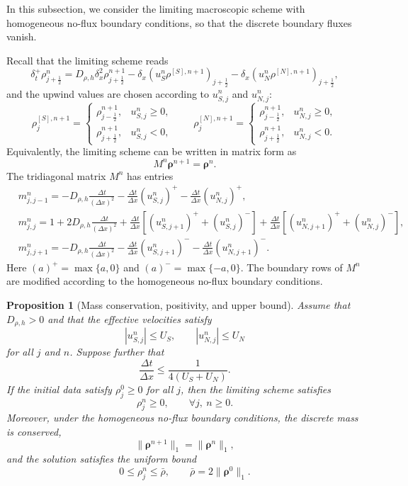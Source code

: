 \documentclass[11pt,twoside]{article}
\theoremstyle{plain}
\newtheorem{proposition}[theorem]{Proposition}
\theoremstyle{nonumberplain}
\newcommand{\brho}{\boldsymbol{\rho}}
\begin{document}
{In this subsection, we consider the limiting macroscopic scheme with
homogeneous no-flux boundary conditions, so that the discrete boundary
fluxes vanish.

Recall that the limiting scheme reads
\[
\delta_t^+\rho_{j+\frac12}^n
=
D_{\rho,h}\delta_x^2\rho_{j+\frac12}^{n+1}
-
\delta_x\left(u_S^n\rho^{[S],n+1}\right)_{j+\frac12}
-
\delta_x\left(u_N^n\rho^{[N],n+1}\right)_{j+\frac12},
\]
and the upwind values are chosen according to $u_{S,j}^n$ and $u_{N,j}^n$:
\[
\rho_j^{[S],n+1}
=
\begin{cases}
\rho_{j-\frac12}^{n+1}, & u_{S,j}^n\ge0,\\
\rho_{j+\frac12}^{n+1}, & u_{S,j}^n<0,
\end{cases}
\qquad
\rho_j^{[N],n+1}
=
\begin{cases}
\rho_{j-\frac12}^{n+1}, & u_{N,j}^n\ge0,\\
\rho_{j+\frac12}^{n+1}, & u_{N,j}^n<0.
\end{cases}
\]
Equivalently, the limiting scheme can be written in matrix form as
\[
M^n\brho^{n+1}=\brho^n .
\]
The tridiagonal matrix $M^n$ has entries
\begin{align*}
&m_{j,j-1}^n
=
-D_{\rho,h}\frac{\Delta t}{(\Delta x)^2}
-\frac{\Delta t}{\Delta x}(u_{S,j}^n)^+
-\frac{\Delta t}{\Delta x}(u_{N,j}^n)^+,\\
&m_{j,j}^n
=
1+2D_{\rho,h}\frac{\Delta t}{(\Delta x)^2}
+\frac{\Delta t}{\Delta x}
\left[(u_{S,j+1}^n)^+ +(u_{S,j}^n)^-\right]
+\frac{\Delta t}{\Delta x}
\left[(u_{N,j+1}^n)^+ +(u_{N,j}^n)^-\right],\\
&m_{j,j+1}^n
=
-D_{\rho,h}\frac{\Delta t}{(\Delta x)^2}
-\frac{\Delta t}{\Delta x}(u_{S,j+1}^n)^-
-\frac{\Delta t}{\Delta x}(u_{N,j+1}^n)^- .
\end{align*}
Here $(a)^+=\max\{a,0\}$ and $(a)^-=\max\{-a,0\}$.
The boundary rows of \(M^n\) are modified according to the homogeneous
no-flux boundary conditions.

\begin{proposition}[Mass conservation, positivity, and upper bound]
Assume that $D_{\rho,h}>0$ and that the effective velocities satisfy
\[
|u_{S,j}^n|\le U_S,\qquad |u_{N,j}^n|\le U_N
\]
for all $j$ and $n$. Suppose further that
\begin{equation}\label{eq:CFL-bound-new}
\frac{\Delta t}{\Delta x}
\le
\frac{1}{4(U_S+U_N)} .
\end{equation}
If the initial data satisfy $\rho_j^0\ge0$ for all $j$, then the
limiting scheme satisfies
\[
\rho_j^n\ge0,\qquad \forall j,\ n\ge0.
\]
Moreover, under the homogeneous no-flux boundary conditions, the discrete
mass is conserved,
\[
\|\brho^{n+1}\|_1=\|\brho^n\|_1,
\]
and the solution satisfies the uniform bound
\[
0\le \rho_j^n\le \bar\rho,\qquad
\bar\rho=2\|\brho^0\|_1 .
\]
\end{proposition}

}
\end{document}
